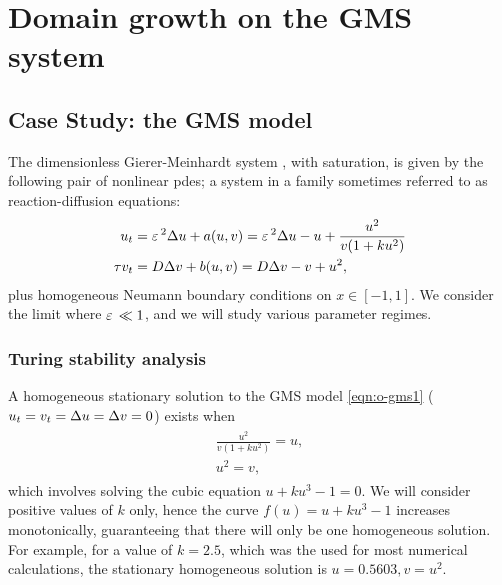 \chapter{Domain growth on the GMS system}
\label{ch:one}

\section{Case Study: the GMS model}

The dimensionless Gierer-Meinhardt system \cite{gierer_theory_1972}, with saturation, is given by the following pair of nonlinear pdes; a system in a family sometimes referred to as reaction-diffusion equations:
% 
\begin{equation}
\label{eqn:o-gms1}
\begin{split}
\begin{aligned}
	u_t &= \varepsilon\,^2\Delta u + a(u,v) = \varepsilon\,^2\Delta u - u +\frac{u^2}{v(1+ku^2)} \\
	\tau v_t &= D\Delta v + b(u,v) = D\Delta v - v + u^2,
\end{aligned}
\end{split}
\end{equation}
% 
plus homogeneous Neumann boundary conditions on $x\in[-1,1]$. We consider the limit where $\varepsilon\,\ll 1$, and we will study various parameter regimes.

\subsection{Turing stability analysis}

A homogeneous stationary solution to the GMS model \eqref{eqn:o-gms1} ($u_t = v_t = \Delta u = \Delta v = 0$) exists when
% 
\begin{equation*}
\begin{split}
\begin{aligned}
	\frac{u^2}{v(1+ku^2)} = u, \\
    u^2 = v,
\end{aligned}
\end{split}
\end{equation*}
% 
which involves solving the cubic equation $u+ku^3-1 = 0$. We will consider positive values of $k$ only, hence the curve $f(u) = u+ku^3-1$ increases monotonically, guaranteeing that there will only be one homogeneous solution. For example, for a value of $k = 2.5$, which was the used for most numerical calculations, the stationary homogeneous solution is $u=0.5603,v=u^2$.


